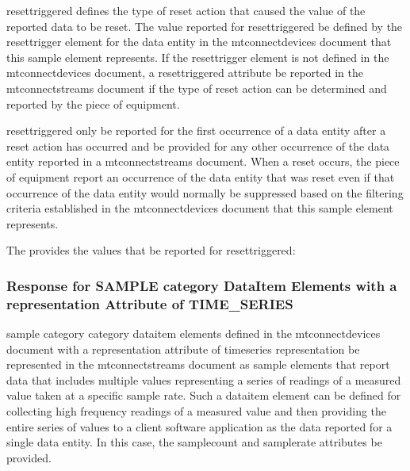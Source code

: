 \gls{resettriggered} defines the \gls{type} of reset action that caused the value of the reported data to be reset.  The value reported for \gls{resettriggered} \may be defined by the \gls{resettrigger} element for the \gls{data entity} in the \gls{mtconnectdevices} document that this \gls{sample} element represents.  If the \gls{resettrigger} element is not defined in the \gls{mtconnectdevices} document, a \gls{resettriggered} attribute \should be reported in the \gls{mtconnectstreams} document if the \gls{type} of reset action can be determined and reported by the piece of equipment.

\gls{resettriggered} \must only be reported for the first occurrence of a \gls{data entity} after a reset action has occurred and \mustnot be provided for any other occurrence of the \gls{data entity} reported in a \gls{mtconnectstreams} document.  When a reset occurs, the piece of equipment \must report an occurrence of the \gls{data entity} that was reset even if that occurrence of the \gls{data entity} would normally be suppressed based on the filtering criteria established in the \gls{mtconnectdevices} document that this \gls{sample} element represents.

The  provides the values that \may be reported for \gls{resettriggered}:    



\subsubsection{Response for SAMPLE category DataItem Elements with a representation Attribute of TIME\_SERIES}
\label{sec:Response for SAMPLE category DataItem Elements with a representation Attribute of TIME_SERIES}

\gls{sample category} category \gls{dataitem} elements defined in the \gls{mtconnectdevices} document with a \gls{representation} attribute of \gls{timeseries representation} \must be represented in the \gls{mtconnectstreams} document as \gls{sample} elements that report data that includes multiple values representing a series of readings of a measured value taken at a specific sample rate.   Such a \gls{dataitem} element can be defined for collecting high frequency readings of a measured value and then providing the entire series of values to a client software application as the data reported for a single \gls{data entity}.  In this case, the \gls{samplecount} and \gls{samplerate} attributes \must be provided. 


